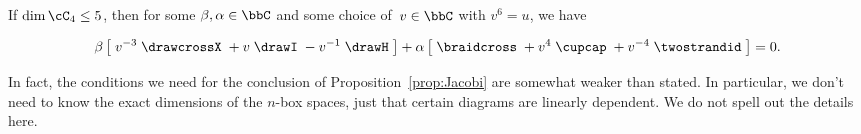 \documentclass[12pt]{amsart}
\begin{document}
\begin{proposition}\label{prop:Jacobi}
If $\dim \cC_4 \leq 5$, then for some $\beta, \alpha \in \bbC$ and some choice
of~$v \in \bbC$ with $v^6 = u$, we have

\begin{equation}
\beta \left[\; v^{-3} \;
\drawcrossX
\;+ v \;
\drawI
\; -v^{-1} \;
 \drawH
\;\right]
 + \alpha
\left[\; \braidcross \;
 + v^{4}\;
\cupcap
\; + v^{-4} \;
 \twostrandid \;
 \right] = 0.\label{eq:quant-except-init}
 \end{equation}
\end{proposition}

In fact, the conditions we need for the conclusion of
Proposition~\ref{prop:Jacobi} are somewhat weaker than stated. In particular,
we don't need to know the exact dimensions of the $n$-box spaces, just that
certain diagrams are linearly dependent. We do not spell out the details here.
\end{document}
